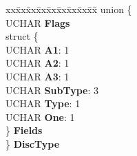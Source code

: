 \begin{DoxyCompactItemize}
\begin{tabbing}
\end{tabbing}\item 
\mbox{\label{struct___r_e_a_d___t_o_c___a_t_i_p_a24b7fc31b4d5894934fefcaa7d65d78e}} 
\begin{tabbing}
xx\=xx\=xx\=xx\=xx\=xx\=xx\=xx\=xx\=\kill
union \{\\
\>UCHAR {\bfseries Flags}\\
\>struct \{\\
\>\>UCHAR {\bfseries A1}: 1\\
\>\>UCHAR {\bfseries A2}: 1\\
\>\>UCHAR {\bfseries A3}: 1\\
\>\>UCHAR {\bfseries SubType}: 3\\
\>\>UCHAR {\bfseries Type}: 1\\
\>\>UCHAR {\bfseries One}: 1\\
\>\} {\bfseries Fields}\\
\} {\bfseries DiscType}\\


\end{tabbing}
\end{DoxyCompactItemize}
